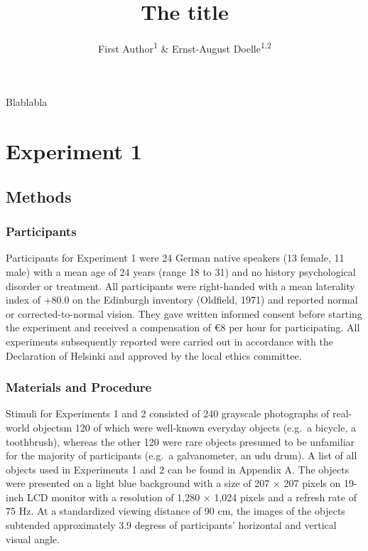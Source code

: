 \documentclass[
  english,
  man,11pt,floatsintext]{apa7}
\title{The title}
\author{First Author\textsuperscript{1} \& Ernst-August Doelle\textsuperscript{1,2}}
\date{}
\affiliation{\vspace{0.5cm}\textsuperscript{1} Wilhelm-Wundt-University\\\textsuperscript{2} Konstanz Business School}
\begin{document}
\maketitle

Blablabla

\hypertarget{experiment-1}{%
\section{Experiment 1}\label{experiment-1}}

\hypertarget{methods}{%
\subsection{Methods}\label{methods}}

\hypertarget{participants}{%
\subsubsection{Participants}\label{participants}}

Participants for Experiment 1 were 24 German native speakers (13 female, 11 male) with a mean age of 24 years (range 18 to 31) and no history psychological disorder or treatment. All participants were right-handed with a mean laterality index of +80.0 on the Edinburgh inventory (Oldfield, 1971) and reported normal or corrected-to-normal vision. They gave written informed consent before starting the experiment and received a compensation of €8 per hour for participating. All experiments subsequently reported were carried out in accordance with the Declaration of Helsinki and approved by the local ethics committee.

\hypertarget{materials-and-procedure}{%
\subsubsection{Materials and Procedure}\label{materials-and-procedure}}

Stimuli for Experiments 1 and 2 consisted of 240 grayscale photographs of real-world objectsm 120 of which were well-known everyday objects (e.g.~a bicycle, a toothbrush), whereas the other 120 were rare objects presumed to be unfamiliar for the majority of participants (e.g.~a galvanometer, an udu drum). A list of all objects used in Experiments 1 and 2 can be found in Appendix A. The objects were presented on a light blue background with a size of 207 × 207 pixels on 19-inch LCD monitor with a resolution of 1,280 × 1,024 pixels and a refresh rate of 75 Hz. At a standardized viewing distance of 90 cm, the images of the objects subtended approximately 3.9 degress of participants' horizontal and vertical visual angle.
\end{document}
